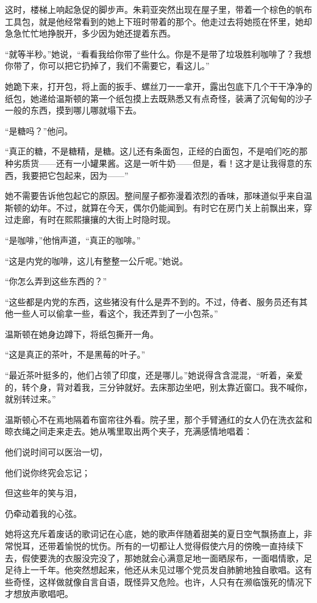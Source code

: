 这时，楼梯上响起急促的脚步声。朱莉亚突然出现在屋子里，带着一个棕色的帆布工具包，就是他经常看到的她上下班时带着的那个。他走过去将她揽在怀里，她却急急忙忙地挣脱开，多少因为她还提着东西。

``就等半秒。''她说，``看看我给你带了些什么。你是不是带了垃圾胜利咖啡了？我想你带了，你可以把它扔掉了，我们不需要它，看这儿。''

她跪下来，打开包，将上面的扳手、螺丝刀一一拿开，露出包底下几个干干净净的纸包，她递给温斯顿的第一个纸包摸上去既熟悉又有点奇怪，装满了沉甸甸的沙子一般的东西，摸到哪儿哪就塌下去。

``是糖吗？''他问。

``真正的糖，不是糖精，是糖。这儿还有条面包，正经的白面包，不是咱们吃的那种劣质货------还有一小罐果酱。这是一听牛奶------但是，看！这才是让我得意的东西，我要把它包起来，因为------''

她不需要告诉他包起它的原因。整间屋子都弥漫着浓烈的香味，那味道似乎来自温斯顿的幼年。不过，就算在今天，偶尔仍能闻到。有时它在房门关上前飘出来，穿过走廊，有时在熙熙攘攘的大街上时隐时现。

``是咖啡，''他悄声道，``真正的咖啡。''

``这是内党的咖啡，这儿有整整一公斤呢。''她说。

``你怎么弄到这些东西的？''

``这些都是内党的东西，这些猪没有什么是弄不到的。不过，侍者、服务员还有其他一些人可以偷拿一些，看这个，我还弄到了一小包茶。''

温斯顿在她身边蹲下，将纸包撕开一角。

``这是真正的茶叶，不是黑莓的叶子。''

``最近茶叶挺多的，他们占领了印度，还是哪儿。''她说得含含混混，``听着，亲爱的，转个身，背对着我，三分钟就好。去床那边坐吧，别太靠近窗口。我不喊你，就别转过来。''

温斯顿心不在焉地隔着布窗帘往外看。院子里，那个手臂通红的女人仍在洗衣盆和晾衣绳之间走来走去。她从嘴里取出两个夹子，充满感情地唱着：

他们说时间可以医治一切，

他们说你终究会忘记；

但这些年的笑与泪，

仍牵动着我的心弦。

她将这充斥着废话的歌词记在心底，她的歌声伴随着甜美的夏日空气飘扬直上，非常悦耳，还带着愉悦的忧伤。所有的一切都让人觉得假使六月的傍晚一直持续下去，假使要洗的衣服没完没了，那她就会心满意足地一面晒尿布，一面唱情歌，足足待上一千年。他突然想起来，他还从未见过哪个党员发自肺腑地独自歌唱。这有些奇怪，这样做就像自言自语，既怪异又危险。也许，人只有在濒临饿死的情况下才想放声歌唱吧。

